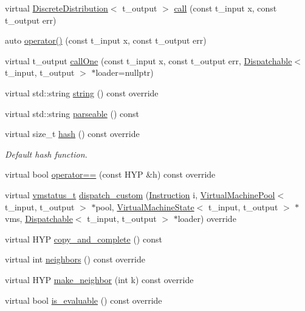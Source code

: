 \begin{DoxyCompactItemize}
\item 
virtual \hyperlink{class_discrete_distribution}{Discrete\+Distribution}$<$ t\+\_\+output $>$ \hyperlink{class_l_o_t_hypothesis_a48858f5add54c1886d946e641b08062a}{call} (const t\+\_\+input x, const t\+\_\+output err)
\item 
auto \hyperlink{class_l_o_t_hypothesis_ae64a27eeb271316fd76cf26a86fff7e6}{operator()} (const t\+\_\+input x, const t\+\_\+output err)
\item 
virtual t\+\_\+output \hyperlink{class_l_o_t_hypothesis_ad792b258bdb4b0828f11ac721f52e704}{call\+One} (const t\+\_\+input x, const t\+\_\+output err, \hyperlink{class_dispatchable}{Dispatchable}$<$ t\+\_\+input, t\+\_\+output $>$ $\ast$loader=nullptr)
\item 
virtual std\+::string \hyperlink{class_l_o_t_hypothesis_a5c91fd3b7ef4ebc585413d723cd17e7e}{string} () const override
\item 
virtual std\+::string \hyperlink{class_l_o_t_hypothesis_a1584633d01abe30a6f69d0664c1e137a}{parseable} () const
\item 
virtual size\+\_\+t \hyperlink{class_l_o_t_hypothesis_aa6859da0a3b422c32b1be2ffa025631a}{hash} () const override
\begin{DoxyCompactList}\small\item\em Default hash function. \end{DoxyCompactList}\item 
virtual bool \hyperlink{class_l_o_t_hypothesis_a198d0632ce824b9547810084abadfb2e}{operator==} (const H\+YP \&h) const override
\item 
virtual \hyperlink{_instruction_8h_a6202215407ab29590bb936ca2996cf64}{vmstatus\+\_\+t} \hyperlink{class_l_o_t_hypothesis_a9aade3ee6939a58e5d5b53505cfb2e7a}{dispatch\+\_\+custom} (\hyperlink{class_instruction}{Instruction} i, \hyperlink{class_virtual_machine_pool}{Virtual\+Machine\+Pool}$<$ t\+\_\+input, t\+\_\+output $>$ $\ast$pool, \hyperlink{class_virtual_machine_state}{Virtual\+Machine\+State}$<$ t\+\_\+input, t\+\_\+output $>$ $\ast$vms, \hyperlink{class_dispatchable}{Dispatchable}$<$ t\+\_\+input, t\+\_\+output $>$ $\ast$loader) override
\item 
virtual H\+YP \hyperlink{class_l_o_t_hypothesis_af0274e15c0e19e8f42324b7099e2b4a1}{copy\+\_\+and\+\_\+complete} () const
\item 
virtual int \hyperlink{class_l_o_t_hypothesis_ac74e874f6b677dc1c013602907627be7}{neighbors} () const override
\item 
virtual H\+YP \hyperlink{class_l_o_t_hypothesis_ae7771176b8b2599f42c75318ee0e9164}{make\+\_\+neighbor} (int k) const override
\item 
virtual bool \hyperlink{class_l_o_t_hypothesis_a68dedaeae92b25b0450f2dc1bd95a35b}{is\+\_\+evaluable} () const override
\end{DoxyCompactItemize}
